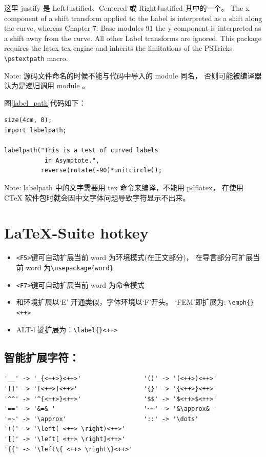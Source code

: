 \documentclass[a4paper,11pt]{article}
\begin{document}
这里 justify 是 LeftJustified、Centered 或 RightJustified 其中的一个。
The x component of a shift transform applied to the Label is
interpreted as a shift along the curve, whereas Chapter 7: Base
modules 91 the y component is interpreted as a shift away from the curve.
All other Label transforms are ignored. This package requires
the latex tex engine and inherits the limitations of the
PSTricks \verb+\pstextpath+ macro.

Note: 源码文件命名的时候不能与代码中导入的 module 同名，
否则可能被编译器认为是递归调用 module 。

图\ref{label_path}代码如下：
\begin{Verbatim}
size(4cm, 0);
import labelpath;

labelpath("This is a test of curved labels
           in Asymptote.",
          reverse(rotate(-90)*unitcircle));
\end{Verbatim}

Note: labelpath 中的文字需要用 tex 命令来编译，不能用 pdflatex，
在使用 CTeX 软件包时就会因中文字体问题导致字符显示不出来。

\section{\LaTeX -Suite hotkey}
\begin{itemize}
\item \verb+<F5>+键可自动扩展当前 word 为环境模式(在正文部分)，
在导言部分可扩展当前 word 为\verb+\usepackage{word}+
\item \verb+<F7>+键可自动扩展当前 word 为命令模式
\item 和环境扩展以`E' 开通类似，字体环境以`F'开头。
	`FEM'即扩展为: \verb|\emph{}<++>|
\item ALT-l 键扩展为：\verb|\label{}<++>|
\end{itemize}

\subsection{智能扩展字符：}
\begin{Verbatim}
'__' -> '_{<++>}<++>'                 '()' -> '(<++>)<++>'
'[]' -> '[<++>]<++>'                  '{}' -> '{<++>}<++>'
'^^' -> '^{<++>}<++>'                 '$$' -> '$<++>$<++>'
'==' -> '&=& '                        '~~' -> '&\approx& '
'=~' -> '\approx'                     '::' -> '\dots'
'((' -> '\left( <++> \right)<++>'
'[[' -> '\left[ <++> \right]<++>'
'{{' -> '\left\{ <++> \right\}<++>'
\end{Verbatim}
\end{document}
